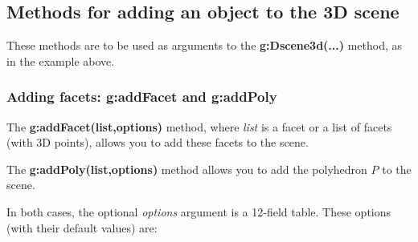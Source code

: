 \subsection{Methods for adding an object to the 3D scene}

These methods are to be used as arguments to the \textbf{g:Dscene3d(...)} method, as in the example above.

\subsubsection{Adding facets: g:addFacet and g:addPoly}

The \textbf{g:addFacet(list,options)} method, where \emph{list} is a facet or a list of facets (with 3D points), allows you to add these facets to the scene.

The \textbf{g:addPoly(list,options)} method allows you to add the polyhedron $P$ to the scene.

In both cases, the optional \emph{options} argument is a 12-field table. These options (with their default values) are:

